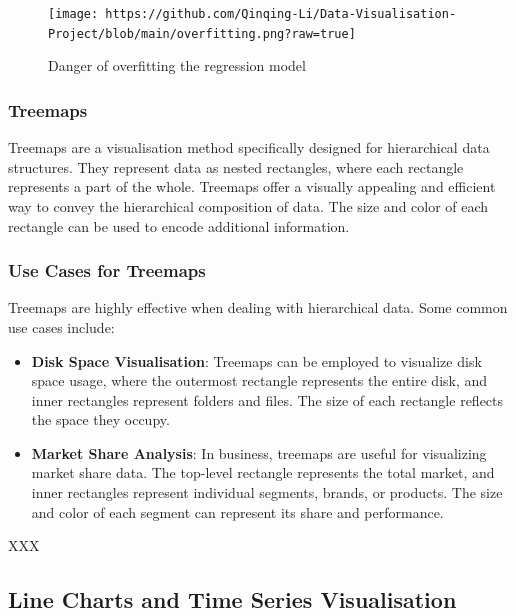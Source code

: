 \documentclass{article}\usepackage[]{graphicx}\usepackage[]{xcolor}
\begin{document}
\begin{figure}[h]
    \centering
    \texttt{[image: https://github.com/Qinqing-Li/Data-Visualisation-Project/blob/main/overfitting.png?raw=true]}
    \caption{Danger of overfitting the regression model}
    \label{fig:noisy}
\end{figure}

\subsubsection{Treemaps}
Treemaps are a visualisation method specifically designed for hierarchical data structures. They represent data as nested rectangles, where each rectangle represents a part of the whole. Treemaps offer a visually appealing and efficient way to convey the hierarchical composition of data. The size and color of each rectangle can be used to encode additional information.

\subsubsection{Use Cases for Treemaps}
Treemaps are highly effective when dealing with hierarchical data. Some common use cases include:
\begin{itemize}
\item \textbf{Disk Space Visualisation}: Treemaps can be employed to visualize disk space usage, where the outermost rectangle represents the entire disk, and inner rectangles represent folders and files. The size of each rectangle reflects the space they occupy.
\item \textbf{Market Share Analysis}: In business, treemaps are useful for visualizing market share data. The top-level rectangle represents the total market, and inner rectangles represent individual segments, brands, or products. The size and color of each segment can represent its share and performance.
\end{itemize}

XXX %


\subsection{Line Charts and Time Series Visualisation}
\end{document}
